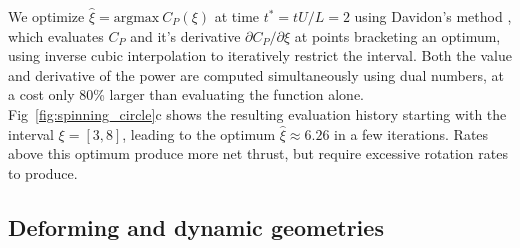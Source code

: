 \documentclass[final,3p,times]{elsarticle}
\begin{document}
We optimize $\hat\xi=\text{argmax}\ C_P(\xi)$ at time $t^*=tU/L=2$ using Davidon's method \cite{davidon1991}, which evaluates $C_P$ and it's derivative $\partial C_P/\partial \xi$ at points bracketing an optimum, using inverse cubic interpolation to iteratively restrict the interval. Both the value and derivative of the power are computed simultaneously using dual numbers, at a cost only 80\% larger than evaluating the function alone. Fig~\ref{fig:spinning_circle}c shows the resulting evaluation history starting with the interval $\xi=[3,8]$, leading to the optimum $\hat\xi\approx 6.26$ in a few iterations. Rates above this optimum produce more net thrust, but require excessive rotation rates to produce.

\subsection{Deforming and dynamic geometries}
\end{document}
